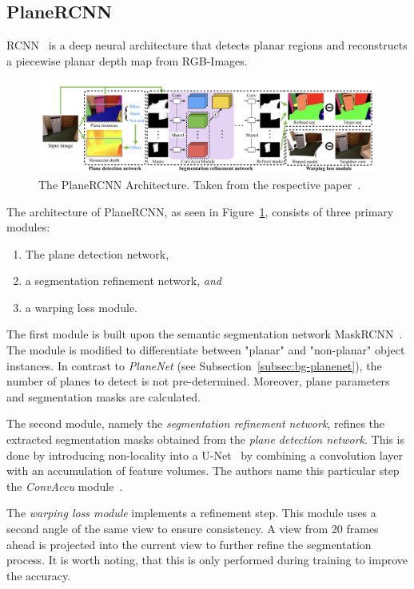 \documentclass[main.tex]{subfiles}
\begin{document}
\subsection{PlaneRCNN}
\label{subsec:bg-planercnn}
RCNN~\cite{Liu_Kim_Gu_Furukawa_Kautz_2019} is a deep neural architecture that detects planar
regions and reconstructs a piecewise planar depth map from RGB-Images.

\begin{figure}[H]
    \centering
    \includegraphics[width=\textwidth]{images/planercnn.png}
    \caption[PlaneRCNN Architecture]{The PlaneRCNN Architecture. Taken from the respective paper~\cite[Figure~2]{Liu_Kim_Gu_Furukawa_Kautz_2019}.}
    \label{fig:planercnn}
\end{figure}

The architecture of PlaneRCNN, as seen in Figure~\ref{fig:planercnn}, consists of three primary modules:
\begin{enumerate}
    \item The plane detection network,
    \item a segmentation refinement network, \textit{and}
    \item a warping loss module.
\end{enumerate}
The first module is built upon the semantic segmentation network MaskRCNN~\cite{he2017mask}. The module is modified to differentiate between "planar" and "non-planar"
object instances. In contrast to \textit{PlaneNet} (see Subsection~\ref{subsec:bg-planenet}), the number of planes to detect is not pre-determined. Moreover,
plane parameters and segmentation masks are calculated.

The second module, namely the \textit{segmentation refinement network}, refines the extracted segmentation masks obtained from the \textit{plane detection network}.
This is done by introducing non-locality into a U-Net~\cite{ronneberger2015u} by combining a convolution layer with an accumulation of feature volumes. The authors name this
particular step the \textit{ConvAccu} module~\cite[Section~3.2]{Liu_Kim_Gu_Furukawa_Kautz_2019}.

The \textit{warping loss module} implements a refinement step.  This module uses a second angle of the same view to ensure consistency. A view from 20 frames ahead is
projected into the current view to further refine the segmentation process. It is worth noting, that this is only performed during training to improve the accuracy.
\end{document}
